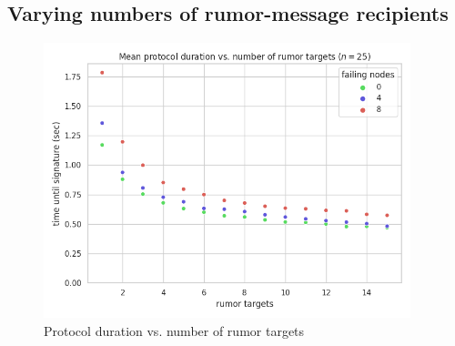 \subsection*{Varying numbers of rumor-message recipients}

\begin{figure}[H]
    \centering
    \includegraphics[width=0.95\textwidth]{figures/7/round_wall_sum_by_rumor_targets.png}
    \captionsetup{labelformat=empty}
    \caption{Protocol duration vs. number of rumor targets}
\end{figure}

